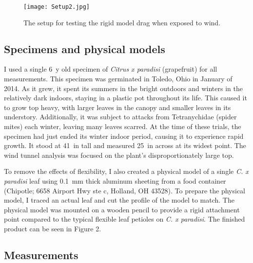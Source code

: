 \begin{figure}
\begin{center}
\texttt{[image: Setup2.jpg]}
\end{center}
\caption{The setup for testing the rigid model drag when exposed to wind.}
\label{fig:methods3}
\end{figure}




\subsection{Specimens and physical models}
	I used a single \SI{6}{y} old specimen of \emph{Citrus x paradisi} (grapefruit) for all measurements. This specimen was germinated in Toledo, Ohio in January of 2014. As it grew, it spent its summers in the bright outdoors and winters in the relatively dark indoors, staying in a plastic pot throughout its life. This caused it to grow top heavy, with larger leaves in the canopy and smaller leaves in its understory. Additionally, it was subject to attacks from Tetranychidae (spider mites) each winter, leaving many leaves scarred. At the time of these trials, the specimen had just ended its winter indoor period, causing it to experience rapid growth. It stood at \SI{41}{in} tall and measured \SI{25}{in} across at its widest point. The wind tunnel analysis was focused on the plant's disproportionately large top.

	To remove the effects of flexibility, I also created a physical model of a single \emph{C. x paradisi} leaf using \SI{0.1}{mm} thick aluminum sheeting from a food container (Chipotle; 6658 Airport Hwy ste c, Holland, OH 43528). To prepare the physical model, I traced an actual leaf and cut the profile of the model to match. The physical model was mounted on a wooden pencil to provide a rigid attachment point compared to the typical flexible leaf petioles on \emph{C. x paradisi}. The finished product can be seen in Figure 2.

\subsection{Measurements}

